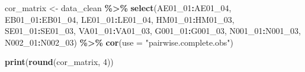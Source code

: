 \documentclass[
]{article}
\newenvironment{Shaded}{\begin{snugshade}}{\end{snugshade}}
\newcommand{\AttributeTok}[1]{\textcolor[rgb]{0.13,0.29,0.53}{#1}}
\newcommand{\DecValTok}[1]{\textcolor[rgb]{0.00,0.00,0.81}{#1}}
\newcommand{\FunctionTok}[1]{\textcolor[rgb]{0.13,0.29,0.53}{\textbf{#1}}}
\newcommand{\NormalTok}[1]{#1}
\newcommand{\OtherTok}[1]{\textcolor[rgb]{0.56,0.35,0.01}{#1}}
\newcommand{\SpecialCharTok}[1]{\textcolor[rgb]{0.81,0.36,0.00}{\textbf{#1}}}
\newcommand{\StringTok}[1]{\textcolor[rgb]{0.31,0.60,0.02}{#1}}
\begin{document}
\begin{Shaded}
\begin{Highlighting}[]
\NormalTok{cor\_matrix }\OtherTok{\textless{}{-}}\NormalTok{ data\_clean }\SpecialCharTok{\%\textgreater{}\%}
  \FunctionTok{select}\NormalTok{(AE01\_01}\SpecialCharTok{:}\NormalTok{AE01\_04, EB01\_01}\SpecialCharTok{:}\NormalTok{EB01\_04, LE01\_01}\SpecialCharTok{:}\NormalTok{LE01\_04,}
\NormalTok{         HM01\_01}\SpecialCharTok{:}\NormalTok{HM01\_03, SE01\_01}\SpecialCharTok{:}\NormalTok{SE01\_03, VA01\_01}\SpecialCharTok{:}\NormalTok{VA01\_03,}
\NormalTok{         G001\_01}\SpecialCharTok{:}\NormalTok{G001\_03, N001\_01}\SpecialCharTok{:}\NormalTok{N001\_03, N002\_01}\SpecialCharTok{:}\NormalTok{N002\_03) }\SpecialCharTok{\%\textgreater{}\%}
  \FunctionTok{cor}\NormalTok{(}\AttributeTok{use =} \StringTok{"pairwise.complete.obs"}\NormalTok{)}

\FunctionTok{print}\NormalTok{(}\FunctionTok{round}\NormalTok{(cor\_matrix, }\DecValTok{4}\NormalTok{))}
\end{Highlighting}
\end{Shaded}
\end{document}
